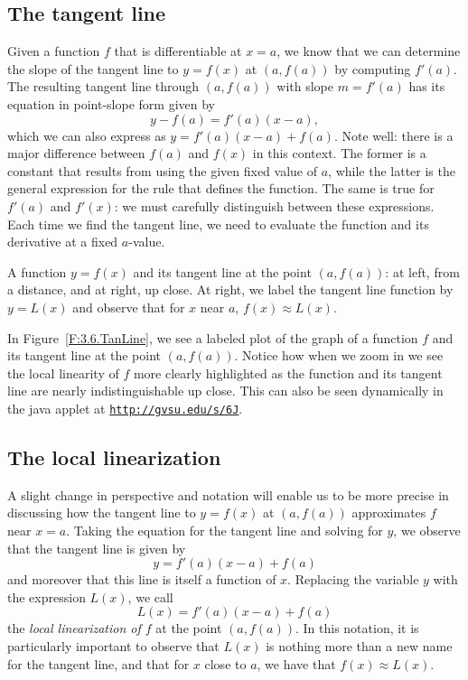 \subsection*{The tangent line}

Given a function $f$ that is differentiable at $x = a$, we know that we can determine the slope of the tangent line to $y = f(x)$ at $(a,f(a))$ by computing $f'(a)$.  The resulting tangent line through $(a,f(a))$ with slope $m = f'(a)$ has its equation in point-slope form given by
$$y - f(a) = f'(a)(x-a),$$
which we can also express as $y = f'(a)(x-a) + f(a)$.  Note well: there is a major difference between $f(a)$ and $f(x)$ in this context.  The former is a constant that results from using the given fixed value of $a$, while the latter is the general expression for the rule that defines the function.  The same is true for $f'(a)$ and $f'(x)$: we must carefully distinguish between these expressions.  Each time we find the tangent line, we need to evaluate the function and its derivative at a fixed $a$-value.


\begin{marginfigure}[1cm] %
\caption{A function $y = f(x)$ and its tangent line at the point $(a,f(a))$: at left, from a distance, and at right, up close.  At right, we label the tangent line function by $y = L(x)$ and observe that for $x $ near $a$, $f(x) \approx L(x)$.} \label{F:3.6.TanLine}
\end{marginfigure}

In Figure~\ref{F:3.6.TanLine}, we see a labeled plot of the graph of a function $f$ and its tangent line at the point $(a,f(a))$.  Notice how when we zoom in we see the local linearity of $f$ more clearly highlighted as the function and its tangent line are nearly indistinguishable up close.  This can also be seen dynamically in the java applet at \href{http://gvsu.edu/s/6J}{\texttt{http://gvsu.edu/s/6J}}.

\subsection*{The local linearization} 

A slight change in perspective and notation will enable us to be more precise in discussing how the tangent line to $y = f(x)$ at $(a,f(a))$ approximates $f$ near $x = a$.  Taking the equation for the tangent line and solving for $y$, we observe that the tangent line is given by
$$y = f'(a)(x-a) + f(a)$$
and moreover that this line is itself a function of $x$.  Replacing the variable $y$ with the expression $L(x)$, we call
$$L(x) = f'(a)(x-a) + f(a)$$
the \emph{local linearization of $f$} at the point $(a,f(a))$.  In this notation, it is particularly important to observe that $L(x)$ is nothing more than a new name for the tangent line, and that for $x$ close to $a$, we have that $f(x) \approx L(x)$.

